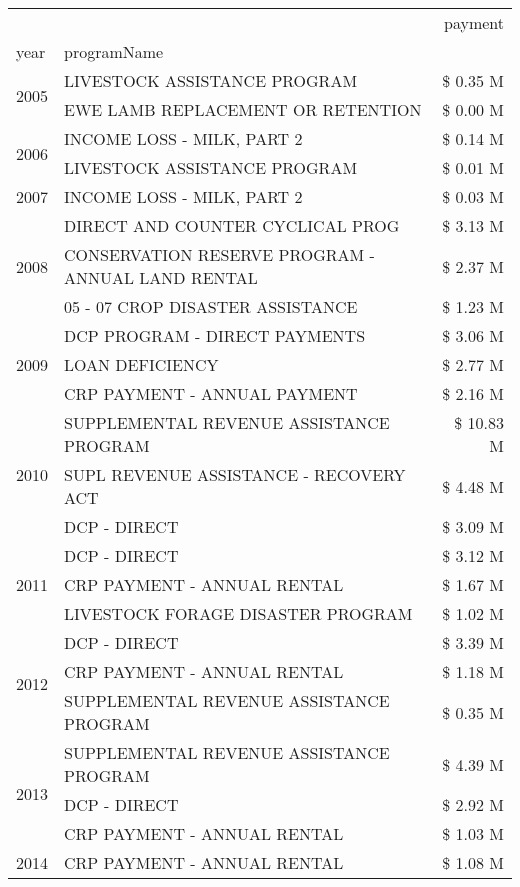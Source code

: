 \begin{tabular}{llr}
\toprule
 &  & payment \\
year & programName &  \\
\midrule
\multirow[t]{2}{*}{2005} & LIVESTOCK ASSISTANCE PROGRAM & \$ 0.35 M \\
 & EWE LAMB REPLACEMENT OR RETENTION & \$ 0.00 M \\
\cline{1-3}
\multirow[t]{2}{*}{2006} & INCOME LOSS - MILK, PART 2 & \$ 0.14 M \\
 & LIVESTOCK ASSISTANCE PROGRAM & \$ 0.01 M \\
\cline{1-3}
2007 & INCOME LOSS - MILK, PART 2 & \$ 0.03 M \\
\cline{1-3}
\multirow[t]{3}{*}{2008} & DIRECT AND COUNTER CYCLICAL PROG & \$ 3.13 M \\
 & CONSERVATION RESERVE PROGRAM - ANNUAL LAND RENTAL & \$ 2.37 M \\
 & 05 - 07 CROP DISASTER ASSISTANCE & \$ 1.23 M \\
\cline{1-3}
\multirow[t]{3}{*}{2009} & DCP PROGRAM - DIRECT PAYMENTS & \$ 3.06 M \\
 & LOAN DEFICIENCY & \$ 2.77 M \\
 & CRP PAYMENT - ANNUAL PAYMENT & \$ 2.16 M \\
\cline{1-3}
\multirow[t]{3}{*}{2010} & SUPPLEMENTAL REVENUE ASSISTANCE PROGRAM & \$ 10.83 M \\
 & SUPL REVENUE ASSISTANCE - RECOVERY ACT & \$ 4.48 M \\
 & DCP - DIRECT & \$ 3.09 M \\
\cline{1-3}
\multirow[t]{3}{*}{2011} & DCP - DIRECT & \$ 3.12 M \\
 & CRP PAYMENT - ANNUAL RENTAL & \$ 1.67 M \\
 & LIVESTOCK FORAGE DISASTER PROGRAM & \$ 1.02 M \\
\cline{1-3}
\multirow[t]{3}{*}{2012} & DCP - DIRECT & \$ 3.39 M \\
 & CRP PAYMENT - ANNUAL RENTAL & \$ 1.18 M \\
 & SUPPLEMENTAL REVENUE ASSISTANCE PROGRAM & \$ 0.35 M \\
\cline{1-3}
\multirow[t]{3}{*}{2013} & SUPPLEMENTAL REVENUE ASSISTANCE PROGRAM & \$ 4.39 M \\
 & DCP - DIRECT & \$ 2.92 M \\
 & CRP PAYMENT - ANNUAL RENTAL & \$ 1.03 M \\
\cline{1-3}
\multirow[t]{3}{*}{2014} & CRP PAYMENT - ANNUAL RENTAL & \$ 1.08 M \\

\end{tabular}
